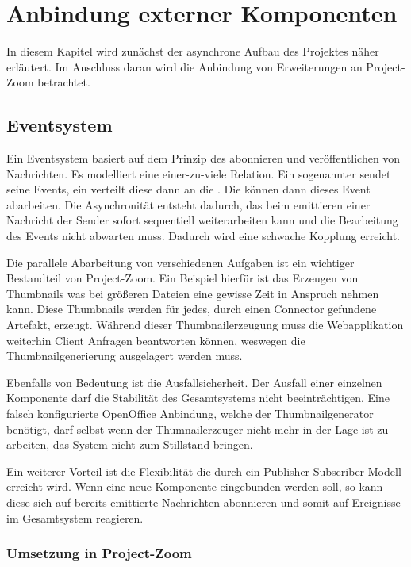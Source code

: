 \chapter{Anbindung externer Komponenten}
In diesem Kapitel wird zunächst der asynchrone Aufbau des Projektes näher erläutert. Im Anschluss daran wird die Anbindung von Erweiterungen an Project-Zoom betrachtet.

\section{Eventsystem}
Ein Eventsystem basiert auf dem Prinzip des abonnieren und veröffentlichen von Nachrichten. Es modelliert eine einer-zu-viele Relation. Ein sogenannter  sendet seine Events, ein  verteilt diese dann an die . Die  können dann dieses Event abarbeiten. Die Asynchronität entsteht dadurch, das beim emittieren einer Nachricht der Sender sofort sequentiell weiterarbeiten kann und die Bearbeitung des Events nicht abwarten muss. Dadurch wird eine schwache Kopplung erreicht. 

Die parallele Abarbeitung von verschiedenen Aufgaben ist ein wichtiger Bestandteil von Project-Zoom. Ein Beispiel hierfür ist das Erzeugen von Thumbnails was bei größeren Dateien eine gewisse Zeit in Anspruch nehmen kann. Diese Thumbnails werden für jedes, durch einen Connector gefundene Artefakt, erzeugt. Während dieser Thumbnailerzeugung muss die Webapplikation weiterhin Client Anfragen beantworten können, weswegen die Thumbnailgenerierung ausgelagert werden muss.

Ebenfalls von Bedeutung ist die Ausfallsicherheit. Der Ausfall einer einzelnen Komponente darf die Stabilität des Gesamtsystems nicht beeinträchtigen. Eine falsch konfigurierte OpenOffice Anbindung, welche der Thumbnailgenerator benötigt, darf selbst wenn der Thumnailerzeuger nicht mehr in der Lage ist zu arbeiten, das System nicht zum Stillstand bringen.

Ein weiterer Vorteil ist die Flexibilität die durch ein Publisher-Subscriber Modell erreicht wird. Wenn eine neue Komponente eingebunden werden soll, so kann diese sich auf bereits emittierte Nachrichten abonnieren und somit auf Ereignisse im Gesamtsystem reagieren.

\subsection{Umsetzung in Project-Zoom}

